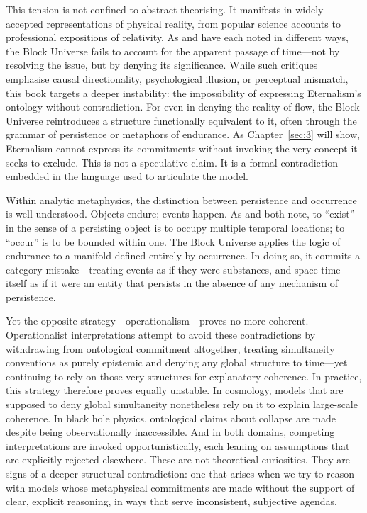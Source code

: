 \documentclass[12pt]{book}
\begin{document}
This tension is not confined to abstract theorising. It manifests in widely accepted representations of physical reality, from popular science accounts to professional expositions of relativity. As \citet{Callender2011a} and \citet{maudlin2002} have each noted in different ways, the Block Universe fails to account for the apparent passage of time---not by resolving the issue, but by denying its significance. While such critiques emphasise causal directionality, psychological illusion, or perceptual mismatch, this book targets a deeper instability: the impossibility of expressing Eternalism's ontology without contradiction. For even in denying the reality of flow, the Block Universe reintroduces a structure functionally equivalent to it, often through the grammar of persistence or metaphors of endurance. As Chapter~\ref{sec:3} will show, Eternalism cannot express its commitments without invoking the very concept it seeks to exclude. This is not a speculative claim. It is a formal contradiction embedded in the language used to articulate the model.

Within analytic metaphysics, the distinction between persistence and occurrence is well understood. Objects endure; events happen. As \citet{markosian2004} and \citet{Sklar1974} both note, to ``exist'' in the sense of a persisting object is to occupy multiple temporal locations; to ``occur'' is to be bounded within one. The Block Universe applies the logic of endurance to a manifold defined entirely by occurrence. In doing so, it commits a category mistake---treating events as if they were substances, and space-time itself as if it were an entity that persists in the absence of any mechanism of persistence.

Yet the opposite strategy---operationalism---proves no more coherent. Operationalist interpretations attempt to avoid these contradictions by withdrawing from ontological commitment altogether, treating simultaneity conventions as purely epistemic and denying any global structure to time---yet continuing to rely on those very structures for explanatory coherence. In practice, this strategy therefore proves equally unstable. In cosmology, models that are supposed to deny global simultaneity nonetheless rely on it to explain large-scale coherence. In black hole physics, ontological claims about collapse are made despite being observationally inaccessible. And in both domains, competing interpretations are invoked opportunistically, each leaning on assumptions that are explicitly rejected elsewhere. These are not theoretical curiosities. They are signs of a deeper structural contradiction: one that arises when we try to reason with models whose metaphysical commitments are made without the support of clear, explicit reasoning, in ways that serve inconsistent, subjective agendas.
\end{document}
